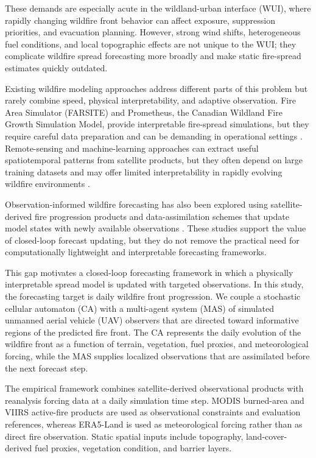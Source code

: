 \documentclass[10pt,letterpaper]{article}
\begin{document}
These demands are especially acute in the wildland-urban interface
(WUI), where rapidly changing wildfire front behavior can affect
exposure, suppression priorities, and evacuation planning. However,
strong wind shifts, heterogeneous fuel conditions, and local topographic
effects are not unique to the WUI; they complicate wildfire spread
forecasting more broadly and make static fire-spread estimates quickly
outdated.

Existing wildfire modeling approaches address different parts of this
problem but rarely combine speed, physical interpretability, and
adaptive observation. Fire Area Simulator (FARSITE) and Prometheus, the
Canadian Wildland Fire Growth Simulation Model, provide interpretable
fire-spread simulations, but they require careful data preparation and
can be demanding in operational settings \cite{finney1998,tymstra2010}. Remote-sensing and
machine-learning approaches can extract useful spatiotemporal patterns
from satellite products, but they often depend on large training
datasets and may offer limited interpretability in rapidly evolving
wildfire environments \cite{chuvieco2020,andrianarivony2024}.

Observation-informed wildfire forecasting has also been explored using
satellite-derived fire progression products and data-assimilation
schemes that update model states with newly available observations
\cite{cheng2022,mcclure2023,chen2022}. These studies support the value
of closed-loop forecast updating, but they do not remove the practical
need for computationally lightweight and interpretable forecasting
frameworks.

This gap motivates a closed-loop forecasting framework in which a
physically interpretable spread model is updated with targeted
observations. In this study, the forecasting target is daily wildfire
front progression. We couple a stochastic cellular automaton (CA) with a
multi-agent system (MAS) of simulated unmanned aerial vehicle (UAV)
observers that are directed toward informative regions of the predicted
fire front. The CA represents the daily evolution of the wildfire front
as a function of terrain, vegetation, fuel proxies, and meteorological
forcing, while the MAS supplies localized observations that are
assimilated before the next forecast step.

The empirical framework combines satellite-derived observational products
with reanalysis forcing data at a daily simulation time step. MODIS
burned-area and VIIRS active-fire products are used as observational
constraints and evaluation references, whereas ERA5-Land is used as
meteorological forcing rather than as direct fire observation. Static
spatial inputs include topography, land-cover-derived fuel proxies,
vegetation condition, and barrier layers.
\end{document}
